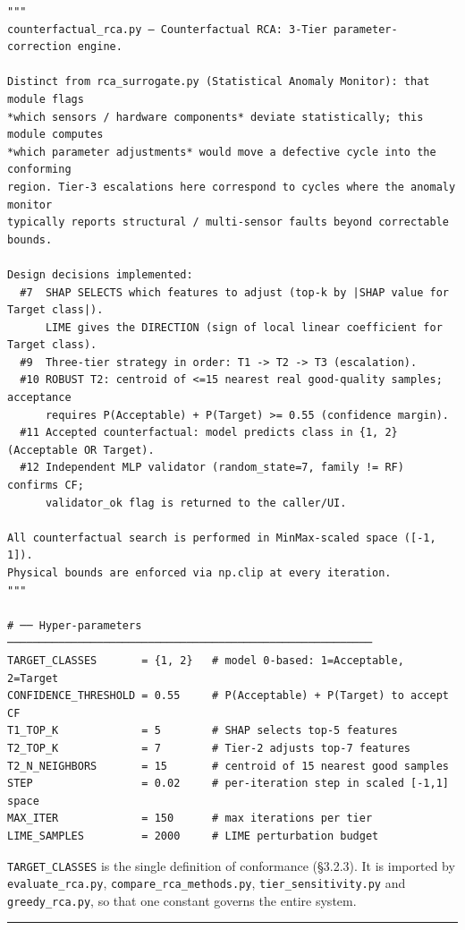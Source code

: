 \begin{verbatim}
"""
counterfactual_rca.py — Counterfactual RCA: 3-Tier parameter-correction engine.

Distinct from rca_surrogate.py (Statistical Anomaly Monitor): that module flags
*which sensors / hardware components* deviate statistically; this module computes
*which parameter adjustments* would move a defective cycle into the conforming
region. Tier-3 escalations here correspond to cycles where the anomaly monitor
typically reports structural / multi-sensor faults beyond correctable bounds.

Design decisions implemented:
  #7  SHAP SELECTS which features to adjust (top-k by |SHAP value for Target class|).
      LIME gives the DIRECTION (sign of local linear coefficient for Target class).
  #9  Three-tier strategy in order: T1 -> T2 -> T3 (escalation).
  #10 ROBUST T2: centroid of <=15 nearest real good-quality samples; acceptance
      requires P(Acceptable) + P(Target) >= 0.55 (confidence margin).
  #11 Accepted counterfactual: model predicts class in {1, 2} (Acceptable OR Target).
  #12 Independent MLP validator (random_state=7, family != RF) confirms CF;
      validator_ok flag is returned to the caller/UI.

All counterfactual search is performed in MinMax-scaled space ([-1, 1]).
Physical bounds are enforced via np.clip at every iteration.
"""

# ── Hyper-parameters ─────────────────────────────────────────────────────────
TARGET_CLASSES       = {1, 2}   # model 0-based: 1=Acceptable, 2=Target
CONFIDENCE_THRESHOLD = 0.55     # P(Acceptable) + P(Target) to accept CF
T1_TOP_K             = 5        # SHAP selects top-5 features
T2_TOP_K             = 7        # Tier-2 adjusts top-7 features
T2_N_NEIGHBORS       = 15       # centroid of 15 nearest good samples
STEP                 = 0.02     # per-iteration step in scaled [-1,1] space
MAX_ITER             = 150      # max iterations per tier
LIME_SAMPLES         = 2000     # LIME perturbation budget
\end{verbatim}

\texttt{TARGET\_CLASSES} is the single definition of conformance (§3.2.3). It is imported by \texttt{evaluate\_rca.py}, \texttt{compare\_rca\_methods.py}, \texttt{tier\_sensitivity.py} and \texttt{greedy\_rca.py}, so that one constant governs the entire system.

\begin{center}\rule{0.5\linewidth}{0.5pt}\end{center}

